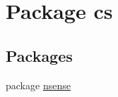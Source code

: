 \hypertarget{namespacecs}{\section{Package cs}
\label{namespacecs}
}
\subsection*{Packages}
\begin{DoxyCompactItemize}
\item 
package \hyperlink{namespacecs_1_1nsense}{nsense}
\end{DoxyCompactItemize}
